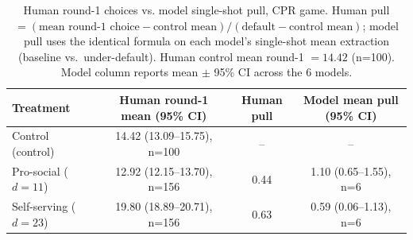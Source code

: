 \begin{table}[t]
\centering
\caption{Human round-1 choices vs. model single-shot pull, CPR game. Human pull $= (\text{mean round-1 choice} - \text{control mean}) / (\text{default} - \text{control mean})$; model pull uses the identical formula on each model's single-shot mean extraction (baseline vs.\ under-default). Human control mean round-1 $= 14.42$ (n=100). Model column reports mean $\pm$ 95\% CI across the 6 models.}
\label{tab:human_round1_pull}
\small
\begin{tabular}{lccc}
\toprule
Treatment & Human round-1 mean (95\% CI) & Human pull & Model mean pull (95\% CI) \\
\midrule
Control (control) & 14.42 (13.09--15.75), n=100 & -- & -- \\
Pro-social ($d{=}11$) & 12.92 (12.15--13.70), n=156 & 0.44 & 1.10 (0.65--1.55), n=6 \\
Self-serving ($d{=}23$) & 19.80 (18.89--20.71), n=156 & 0.63 & 0.59 (0.06--1.13), n=6 \\
\bottomrule
\end{tabular}
\end{table}
